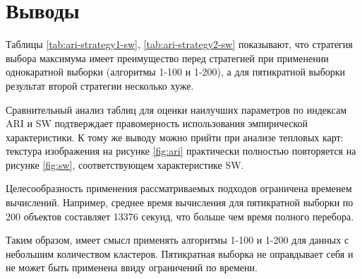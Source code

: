 \documentclass[12pt,twoside,a4paper,tikz,border=5]{refart}
\begin{document}
	
	\section{Выводы}
		Таблицы \ref{tab:ari-strategy1-sw}, \ref{tab:ari-strategy2-sw} показывают, что стратегия выбора максимума 	 имеет преимущество перед стратегией 	 при применении однокаратной выборки (алгоритмы 1-100 и 1-200), а для пятикратной выборки результат второй стратегии несколько хуже. 
		
		Сравнительный анализ таблиц для оценки наилучших параметров по индексам ARI и SW  подтверждает правомерность использования эмпирической характеристики. К тому же выводу можно прийти при анализе тепловых карт: текстура изображения на рисунке \ref{fig:ari} практически полностью повторяется на рисунке \ref{fig:sw}, соответствующем характеристике SW.
		
		Целесообразность применения рассматриваемых подходов ограничена временем вычислений. Например, среднее время вычисления для пятикратной выборки по 200 объектов составляет 13376 секунд, что больше чем время полного перебора. 
		
		Таким образом, имеет смысл применять алгоритмы 1-100 и 1-200 для данных с небольшим количеством кластеров. Пятикратная выборка не оправдывает себя и не может быть применена ввиду ограничений по времени.
		
	
	
	\newpage
	
	
	
\end{document}
